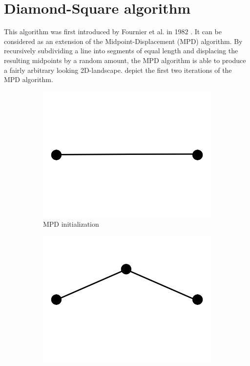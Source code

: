 \documentclass[11pt,a4paper,twoside,openright]{report}
\begin{document}
\section{Diamond-Square algorithm}
This algorithm was first introduced by Fournier et al. in 1982 \cite{Fournier:1982:CRS:358523.358553}. It can be considered as an extension of the Midpoint-Displacement (MPD) algorithm. By recursively subdividing a line into segments of equal length and displacing the resulting midpoints by a random amount, the MPD algorithm is able to produce a fairly arbitrary looking 2D-landscape.  depict the first two iterations of the MPD algorithm.
\begin{figure}[h]
  \centering
  \begin{subfigure}[b]{0.32\textwidth}
    \includegraphics[width=\textwidth]{mpd0.png}
    \caption{MPD initialization}
    \label{fig:mpd0}
  \end{subfigure}
  \begin{subfigure}[b]{0.32\textwidth}
    \includegraphics[width=\textwidth]{mpd1.png}

\end{subfigure}
\end{figure}
\end{document}
